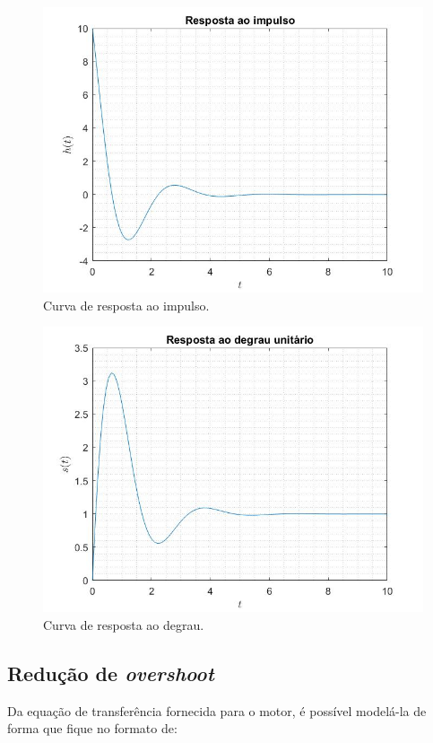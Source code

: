 \documentclass[a4paper,12pt,oneside,openany,table,xcdraw]{article}
\begin{document}
\vspace{0.2cm}
\begin{figure}[H]
\centering
\includegraphics[width=14cm]{ex3-ht}
\caption{Curva de resposta ao impulso.}
\label{ex3:ht}
\end{figure}

\vspace{0.2cm}
\begin{figure}[H]
\centering
\includegraphics[width=14cm]{ex3-st}
\caption{Curva de resposta ao degrau.}
\label{ex3:st}
\end{figure}

\vspace{0.3cm}
\subsection{Redução de \emph{overshoot}}
Da equação de transferência fornecida para o motor, é possível modelá-la de forma que fique no formato de:
\end{document}
